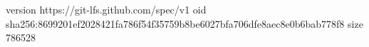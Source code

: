 version https://git-lfs.github.com/spec/v1
oid sha256:8699201ef2028421fa786f54f35759b8be6027bfa706dfe8aec8e0b6bab778f8
size 786528
